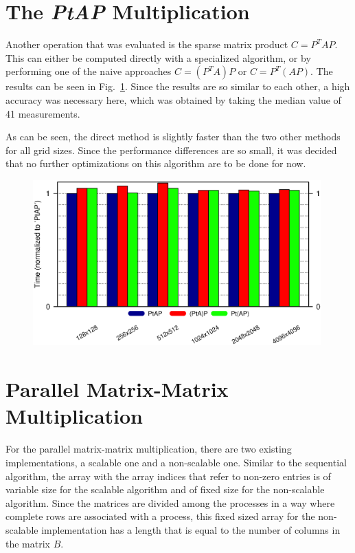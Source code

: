 \section{The \textit{PtAP} Multiplication}
Another operation that was evaluated is the sparse matrix product $C = P^T A P$. This can either be computed directly with a specialized algorithm, or by performing one of the naive approaches $C = (P^T A) P$ or $C = P^T (A P)$. The results can be seen in Fig.~\ref{fig:ex2_ptap}. Since the results are so similar to each other, a high accuracy was necessary here, which was obtained by taking the median value of 41 measurements.

As can be seen, the direct method is slightly faster than the two other methods for all grid sizes. 	Since the performance differences are so small, it was decided that no further optimizations on this algorithm are to be done for now.

\begin{figure}[tbp]
	\centering
	\includegraphics[width=0.99\textwidth,  trim={0 2.cm 0 6cm},clip]{ex2_PtAP}
	\caption{} 
	\label{fig:ex2_ptap}
\end{figure}

\section{Parallel Matrix-Matrix Multiplication}
For the parallel matrix-matrix multiplication, there are two existing implementations, a scalable one and a non-scalable one. Similar to the sequential algorithm, the array with the array indices that refer to non-zero entries is of variable size for the scalable algorithm and of fixed size for the non-scalable algorithm. Since the matrices are divided among the processes in a way where complete rows are  associated with a process, this fixed sized array for the non-scalable implementation has a length that is equal to the number of columns in the matrix $B$. 

